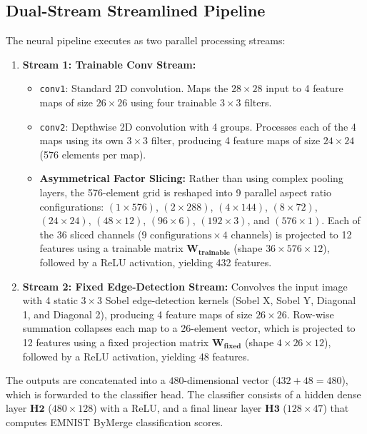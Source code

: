 \documentclass[12pt,a4paper]{article}
\begin{document}
\subsection{Dual-Stream Streamlined Pipeline}
The neural pipeline executes as two parallel processing streams:
\begin{enumerate}
    \item \textbf{Stream 1: Trainable Conv Stream:}
    \begin{itemize}
        \item \texttt{conv1}: Standard 2D convolution. Maps the $28 \times 28$ input to 4 feature maps of size $26 \times 26$ using four trainable $3 \times 3$ filters.
        \item \texttt{conv2}: Depthwise 2D convolution with 4 groups. Processes each of the 4 maps using its own $3 \times 3$ filter, producing 4 feature maps of size $24 \times 24$ (576 elements per map).
        \item \textbf{Asymmetrical Factor Slicing:} Rather than using complex pooling layers, the 576-element grid is reshaped into 9 parallel aspect ratio configurations: $(1 \times 576)$, $(2 \times 288)$, $(4 \times 144)$, $(8 \times 72)$, $(24 \times 24)$, $(48 \times 12)$, $(96 \times 6)$, $(192 \times 3)$, and $(576 \times 1)$. Each of the 36 sliced channels ($9 \text{ configurations} \times 4 \text{ channels}$) is projected to 12 features using a trainable matrix $\mathbf{W}_{\mathbf{trainable}}$ (shape $36 \times 576 \times 12$), followed by a ReLU activation, yielding 432 features.
    \end{itemize}
    
    \item \textbf{Stream 2: Fixed Edge-Detection Stream:}
    Convolves the input image with 4 static $3 \times 3$ Sobel edge-detection kernels (Sobel X, Sobel Y, Diagonal 1, and Diagonal 2), producing 4 feature maps of size $26 \times 26$. Row-wise summation collapses each map to a 26-element vector, which is projected to 12 features using a fixed projection matrix $\mathbf{W}_{\mathbf{fixed}}$ (shape $4 \times 26 \times 12$), followed by a ReLU activation, yielding 48 features.
\end{enumerate}
The outputs are concatenated into a $480$-dimensional vector ($432 + 48 = 480$), which is forwarded to the classifier head. The classifier consists of a hidden dense layer $\mathbf{H2}$ ($480 \times 128$) with a ReLU, and a final linear layer $\mathbf{H3}$ ($128 \times 47$) that computes EMNIST ByMerge classification scores.
\end{document}
